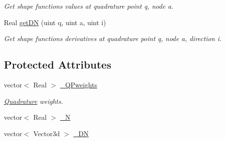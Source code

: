 \begin{DoxyCompactItemize}
\begin{DoxyCompactList}\small\item\em Get shape functions values at quadrature point q, node a. \item\end{DoxyCompactList}\item 
\hypertarget{classvoom_1_1_f_egeom_element1_d_a93f38ac2f7aada7e62a266533f8dca21}{
Real \hyperlink{classvoom_1_1_f_egeom_element1_d_a93f38ac2f7aada7e62a266533f8dca21}{getDN} (uint q, uint a, uint i)}
\label{classvoom_1_1_f_egeom_element1_d_a93f38ac2f7aada7e62a266533f8dca21}

\begin{DoxyCompactList}\small\item\em Get shape functions derivatives at quadrature point q, node a, direction i. \item\end{DoxyCompactList}\end{DoxyCompactItemize}
\subsection*{Protected Attributes}
\begin{DoxyCompactItemize}
\item 
\hypertarget{classvoom_1_1_f_egeom_element1_d_a2511be8bd1183f11dc212f7de387ffa3}{
vector$<$ Real $>$ \hyperlink{classvoom_1_1_f_egeom_element1_d_a2511be8bd1183f11dc212f7de387ffa3}{\_\-QPweights}}
\label{classvoom_1_1_f_egeom_element1_d_a2511be8bd1183f11dc212f7de387ffa3}

\begin{DoxyCompactList}\small\item\em \hyperlink{classvoom_1_1_quadrature}{Quadrature} weights. \item\end{DoxyCompactList}\item 
vector$<$ Real $>$ \hyperlink{classvoom_1_1_f_egeom_element1_d_a3fdff0f1167383a0aaddad60100debe7}{\_\-N}
\item 
vector$<$ Vector3d $>$ \hyperlink{classvoom_1_1_f_egeom_element1_d_ac24d6f4aa2a37ac19e703b1af4053d17}{\_\-DN}
\end{DoxyCompactItemize}


